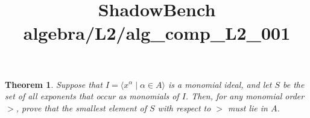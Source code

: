 \documentclass{article}
\title{ShadowBench algebra/L2/alg\_comp\_L2\_001}
\newtheorem{theorem}{Theorem}
\begin{document}
\maketitle

\begin{theorem}
Suppose that $I = \langle x^\alpha \mid \alpha \in A \rangle$ is a monomial ideal, and let $S$ be the set of all exponents that occur as monomials of $I$. Then, for any monomial order $>$, prove that the smallest element of $S$ with respect to $>$ must lie in $A$.
\end{theorem}
\end{document}
